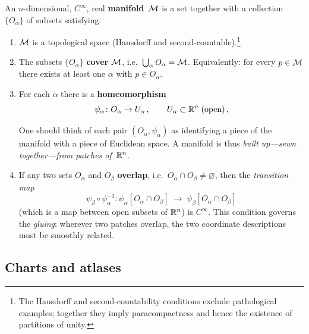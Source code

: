 \begin{definition}[Manifold]\label{def:manifold}
  An $n$-dimensional, $C^\infty$, real \textbf{manifold}~$\mathcal{M}$ is a set
  together with a collection $\{O_\alpha\}$ of subsets satisfying:
  \begin{enumerate}
    \item[\textup{(0)}] $\mathcal{M}$ is a topological space (Hausdorff and
      second-countable).\footnote{The Hausdorff and second-countability
      conditions exclude pathological examples; together they imply
      paracompactness and hence the existence of partitions of unity.}
    \item[\textup{(1)}] The subsets $\{O_\alpha\}$ \textbf{cover} $\mathcal{M}$,
      i.e.\ $\bigcup_\alpha O_\alpha = \mathcal{M}$.
      Equivalently: for every $p\in\mathcal{M}$ there exists at least one
      $\alpha$ with $p\in O_\alpha$.
    \item[\textup{(2)}] For each $\alpha$ there is a
      \textbf{homeomorphism}
      \[
        \psi_\alpha \colon O_\alpha \to U_\alpha\,,
        \qquad U_\alpha \subset \mathbb{R}^{n}\;\text{(open)}\,,
      \]

      

      One should think of each pair $(O_\alpha,\psi_\alpha)$ as
      identifying a piece of the manifold with a piece of
      Euclidean space.  A manifold is thus \emph{built up---sewn
      together---from patches of~$\mathbb{R}^{n}$}.

    \item[\textup{(3)}] If any two sets $O_\alpha$ and $O_\beta$
      \textbf{overlap}, i.e.\ $O_\alpha \cap O_\beta \neq \varnothing$,
      then the \emph{transition map}
      \[
        \psi_\beta \circ \psi_\alpha^{-1}
          \colon \psi_\alpha[O_\alpha\cap O_\beta]
          \;\to\; \psi_\beta[O_\alpha\cap O_\beta]
      \]
      (which is a map between open subsets of $\mathbb{R}^{n}$)
      is $C^\infty$.  This condition governs the \emph{gluing}:
      wherever two patches overlap, the two coordinate
      descriptions must be smoothly related.
  \end{enumerate}
\end{definition}




\subsection{Charts and atlases}

